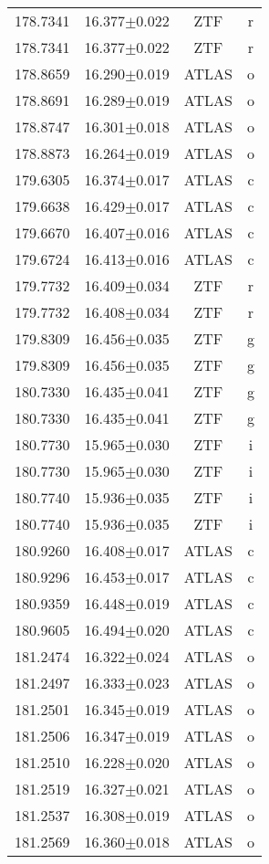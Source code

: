 \begin{table}
\begin{tabular}{cccc}
178.7341 & 16.377$\pm$0.022 & ZTF & r \\
178.7341 & 16.377$\pm$0.022 & ZTF & r \\
178.8659 & 16.290$\pm$0.019 & ATLAS & o \\
178.8691 & 16.289$\pm$0.019 & ATLAS & o \\
178.8747 & 16.301$\pm$0.018 & ATLAS & o \\
178.8873 & 16.264$\pm$0.019 & ATLAS & o \\
179.6305 & 16.374$\pm$0.017 & ATLAS & c \\
179.6638 & 16.429$\pm$0.017 & ATLAS & c \\
179.6670 & 16.407$\pm$0.016 & ATLAS & c \\
179.6724 & 16.413$\pm$0.016 & ATLAS & c \\
179.7732 & 16.409$\pm$0.034 & ZTF & r \\
179.7732 & 16.408$\pm$0.034 & ZTF & r \\
179.8309 & 16.456$\pm$0.035 & ZTF & g \\
179.8309 & 16.456$\pm$0.035 & ZTF & g \\
180.7330 & 16.435$\pm$0.041 & ZTF & g \\
180.7330 & 16.435$\pm$0.041 & ZTF & g \\
180.7730 & 15.965$\pm$0.030 & ZTF & i \\
180.7730 & 15.965$\pm$0.030 & ZTF & i \\
180.7740 & 15.936$\pm$0.035 & ZTF & i \\
180.7740 & 15.936$\pm$0.035 & ZTF & i \\
180.9260 & 16.408$\pm$0.017 & ATLAS & c \\
180.9296 & 16.453$\pm$0.017 & ATLAS & c \\
180.9359 & 16.448$\pm$0.019 & ATLAS & c \\
180.9605 & 16.494$\pm$0.020 & ATLAS & c \\
181.2474 & 16.322$\pm$0.024 & ATLAS & o \\
181.2497 & 16.333$\pm$0.023 & ATLAS & o \\
181.2501 & 16.345$\pm$0.019 & ATLAS & o \\
181.2506 & 16.347$\pm$0.019 & ATLAS & o \\
181.2510 & 16.228$\pm$0.020 & ATLAS & o \\
181.2519 & 16.327$\pm$0.021 & ATLAS & o \\
181.2537 & 16.308$\pm$0.019 & ATLAS & o \\
181.2569 & 16.360$\pm$0.018 & ATLAS & o \\

\end{tabular}
\end{table}
